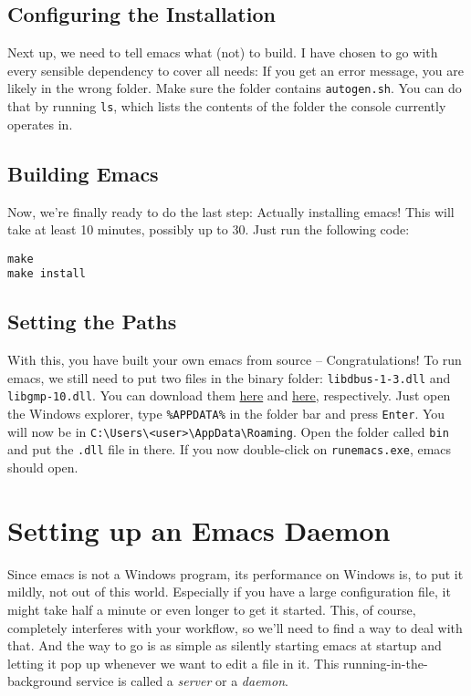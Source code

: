 \documentclass[a4paper, fontsize=11pt, headings=optiontohead, headsepline=true, twoside=false]{scrartcl}
\begin{document}
\subsection{Configuring the Installation}
\label{sec:org50ff080}
Next up, we need to tell emacs what (not) to build. I have chosen to
go with every sensible dependency to cover all needs:
If you get an error message, you are likely in the wrong folder. Make
sure the folder contains \texttt{autogen.sh}. You can do that by running \texttt{ls},
which lists the contents of the folder the console currently operates in.
\subsection{Building Emacs}
\label{sec:orged33947}
Now, we're finally ready to do the last step: Actually installing
emacs! This will take at least 10 minutes, possibly up to 30. Just run
the following code:
\lstset{language=bash,label= ,caption= ,captionpos=b,numbers=none}
\begin{lstlisting}
make
make install 
\end{lstlisting}
\subsection{Setting the Paths}
\label{sec:org44cae5c}
With this, you have built your own emacs from source --
Congratulations! To run emacs, we still need to put two files in the
binary folder: \texttt{libdbus-1-3.dll} and \texttt{libgmp-10.dll}. You can download
them \href{https://www.exefiles.com/de/dll/libdbus-1-3-dll/}{here} and \href{https://www.dll-files.com/libgmp-10.dll.html}{here}, respectively. Just open the Windows explorer, type
\texttt{\%APPDATA\%} in the folder bar and press \texttt{Enter}. You will now be in
\texttt{C:\textbackslash{}Users\textbackslash{}<user>\textbackslash{}AppData\textbackslash{}Roaming}. Open the folder called \texttt{bin} and put
the \texttt{.dll} file in there. If you now double-click on \texttt{runemacs.exe},
emacs should open.
\section{Setting up an Emacs Daemon}
\label{sec:org6affc20}
Since emacs is not a Windows program, its performance on Windows is,
to put it mildly, not out of this world. Especially if
you have a large configuration file, it might take half a minute or even
longer to get it started. This, of course, completely interferes with
your workflow, so we'll need to find a way to deal with that. And the
way to go is as simple as silently starting emacs at startup and
letting it pop up whenever we want to edit a file in it. This
running-in-the-background service is called a \emph{server} or a \emph{daemon}. 
\end{document}
